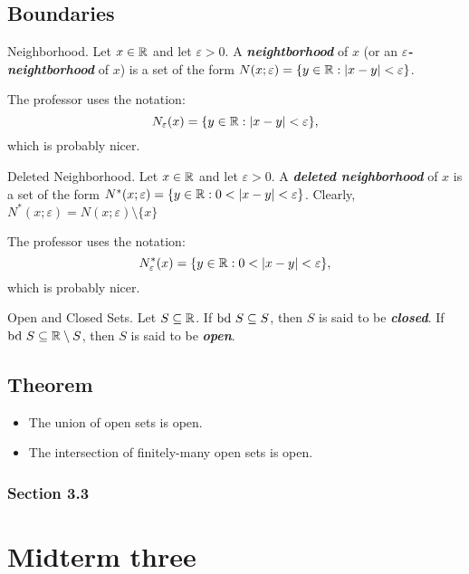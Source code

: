 \documentclass[12pt]{article}
\begin{document}
\subsection{Boundaries}
\label{sec:org451612e}
\begin{definition}{Neighborhood.}
  Let $x\in\mathbb{R}$ and let $\varepsilon>0$. A \textit{\textbf{neightborhood}}
  of $x$ (or an \textit{\textbf{$\varepsilon$-neightborhood}} of $x$) is a
  set of the form $N(x; \varepsilon)=\{y\in\mathbb{R} : \left|x-y\right|<\varepsilon\}$.
  \begin{remark}
    The professor uses the notation: $$N_\varepsilon(x)=\{y\in\mathbb{R} :
    \left|x-y\right|<\varepsilon\},$$ which is probably nicer.
  \end{remark}
\end{definition}

\begin{definition}{Deleted Neighborhood.}
  Let $x\in\mathbb{R}$ and let $\varepsilon>0$. A \textit{\textbf{deleted
      neighborhood}} of $x$ is a set of the form $N^*(x;\varepsilon)=\{y\in\mathbb{R}
  : 0<\left|x-y\right|<\varepsilon\}$. Clearly, $N^*(x;\varepsilon) =
  N(x;\varepsilon)\setminus\{x\}$
  \begin{remark}
    The professor uses the notation: $$N_\varepsilon^*(x)=\{y\in\mathbb{R} :
    0<\left|x-y\right|<\varepsilon\},$$ which is probably nicer.
  \end{remark}
\end{definition}

\begin{definition}{Open and Closed Sets.}
  Let $S \subseteq \mathbb{R}$. If $\text{bd }S \subseteq S$, then $S$ is said to be
  \textit{\textbf{closed}}. If $\text{bd }S \subseteq \mathbb{R} \setminus S$, then $S$ is
  said to be \textit{\textbf{open}}.
\end{definition}

\subsection{Theorem}
\label{sec:org80cd39a}
\begin{itemize}
\item The union of open sets is open.
\item The intersection of finitely-many open sets is open.
\end{itemize}
\subsubsection{Section 3.3}
\label{sec:orgccdc12a}
\section{Midterm three}
\label{sec:orga479a4c}
\end{document}
